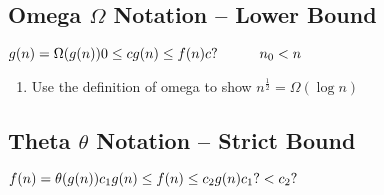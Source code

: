 \documentclass[12pt]{report}
\begin{document}
\noindent
\subsection{Omega $\Omega$ Notation -- Lower Bound}
$g(n)=\Omega(g(n))\\
0 \leq cg(n) \leq f(n)\\
c?\mbox{~~~~~~~~~}n_{0} < n$

\begin{enumerate}[label=\arabic*., start=2]
    \item Use the definition of omega to show $n^{\frac{1}{2}}=\Omega(\log n)$ 
\end{enumerate}

\subsection{Theta $\theta$ Notation -- Strict Bound}
$f(n)=\theta(g(n))\\
c_{1}g(n) \leq f(n) \leq c_{2}g(n)\\
c_{1}?<c_{2}?$
\end{document}
